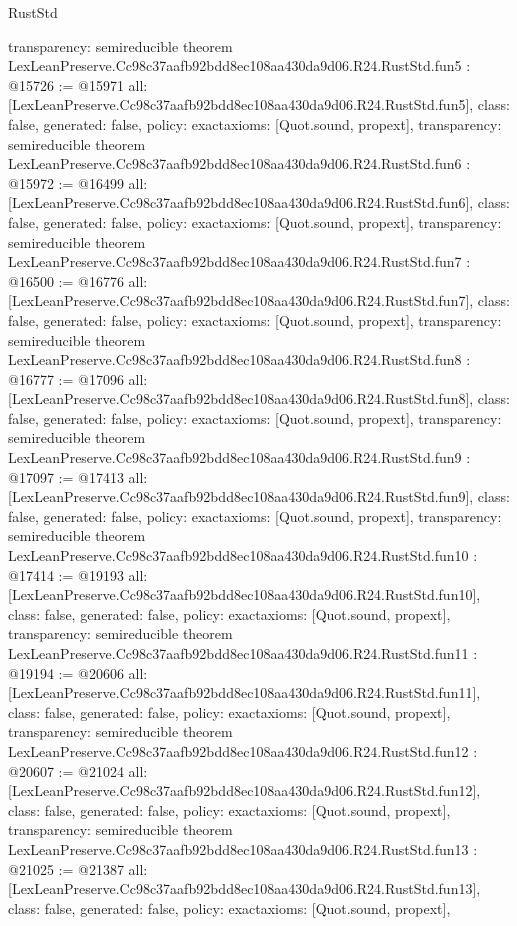 \begin{lexlean}{RustStd}
\begin{coremodule}
{  transparency: semireducible
}
theorem LexLeanPreserve.Cc98c37aafb92bdd8ec108aa430da9d06.R24.RustStd.fun5 : @15726 := @15971 {
  all: [LexLeanPreserve.Cc98c37aafb92bdd8ec108aa430da9d06.R24.RustStd.fun5],
  class: false,
  generated: false,
  policy: exact{axioms: [Quot.sound, propext]},
  transparency: semireducible
}
theorem LexLeanPreserve.Cc98c37aafb92bdd8ec108aa430da9d06.R24.RustStd.fun6 : @15972 := @16499 {
  all: [LexLeanPreserve.Cc98c37aafb92bdd8ec108aa430da9d06.R24.RustStd.fun6],
  class: false,
  generated: false,
  policy: exact{axioms: [Quot.sound, propext]},
  transparency: semireducible
}
theorem LexLeanPreserve.Cc98c37aafb92bdd8ec108aa430da9d06.R24.RustStd.fun7 : @16500 := @16776 {
  all: [LexLeanPreserve.Cc98c37aafb92bdd8ec108aa430da9d06.R24.RustStd.fun7],
  class: false,
  generated: false,
  policy: exact{axioms: [Quot.sound, propext]},
  transparency: semireducible
}
theorem LexLeanPreserve.Cc98c37aafb92bdd8ec108aa430da9d06.R24.RustStd.fun8 : @16777 := @17096 {
  all: [LexLeanPreserve.Cc98c37aafb92bdd8ec108aa430da9d06.R24.RustStd.fun8],
  class: false,
  generated: false,
  policy: exact{axioms: [Quot.sound, propext]},
  transparency: semireducible
}
theorem LexLeanPreserve.Cc98c37aafb92bdd8ec108aa430da9d06.R24.RustStd.fun9 : @17097 := @17413 {
  all: [LexLeanPreserve.Cc98c37aafb92bdd8ec108aa430da9d06.R24.RustStd.fun9],
  class: false,
  generated: false,
  policy: exact{axioms: [Quot.sound, propext]},
  transparency: semireducible
}
theorem LexLeanPreserve.Cc98c37aafb92bdd8ec108aa430da9d06.R24.RustStd.fun10 : @17414 := @19193 {
  all: [LexLeanPreserve.Cc98c37aafb92bdd8ec108aa430da9d06.R24.RustStd.fun10],
  class: false,
  generated: false,
  policy: exact{axioms: [Quot.sound, propext]},
  transparency: semireducible
}
theorem LexLeanPreserve.Cc98c37aafb92bdd8ec108aa430da9d06.R24.RustStd.fun11 : @19194 := @20606 {
  all: [LexLeanPreserve.Cc98c37aafb92bdd8ec108aa430da9d06.R24.RustStd.fun11],
  class: false,
  generated: false,
  policy: exact{axioms: [Quot.sound, propext]},
  transparency: semireducible
}
theorem LexLeanPreserve.Cc98c37aafb92bdd8ec108aa430da9d06.R24.RustStd.fun12 : @20607 := @21024 {
  all: [LexLeanPreserve.Cc98c37aafb92bdd8ec108aa430da9d06.R24.RustStd.fun12],
  class: false,
  generated: false,
  policy: exact{axioms: [Quot.sound, propext]},
  transparency: semireducible
}
theorem LexLeanPreserve.Cc98c37aafb92bdd8ec108aa430da9d06.R24.RustStd.fun13 : @21025 := @21387 {
  all: [LexLeanPreserve.Cc98c37aafb92bdd8ec108aa430da9d06.R24.RustStd.fun13],
  class: false,
  generated: false,
  policy: exact{axioms: [Quot.sound, propext]},
}
\end{coremodule}
\end{lexlean}
